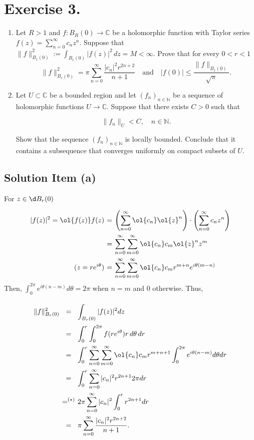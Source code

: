 
\section*{Exercise 3.}
\begin{enumerate}[label=(\alph*)]
    \item Let \( R > 1 \) and \( f : B_R(0) \to \mathbb{C} \) be a holomorphic function with Taylor series \( f(z) = \sum_{n=0}^{\infty} c_n z^n \). Suppose that \( \| f \|_{B_1(0)}^2 := \int_{B_1(0)} |f(z)|^2 \, dz = M < \infty \).
    Prove that for every \( 0 < r < 1 \)
    \[
    \| f \|_{B_r(0)}^2 = \pi \sum_{n=0}^{\infty} \frac{|c_n|^2 r^{2n+2}}{n + 1}
    \quad \text{and} \quad
    |f(0)| \leq \frac{\| f \|_{B_1(0)}}{\sqrt{\pi}}.
    \]
    \item Let \( U \subset \mathbb{C} \) be a bounded region and let \( (f_n)_{n \in \mathbb{N}} \) be a sequence of holomorphic functions \( U \to \mathbb{C} \). Suppose that there exists \( C > 0 \) such that

    \[
    \| f_n \|_U < C, \quad n \in \mathbb{N}.
    \]
    
    Show that the sequence \( (f_n)_{n \in \mathbb{N}} \) is locally bounded. Conclude that it contains a subsequence that converges uniformly on compact subsets of \( U \).
\end{enumerate}


\subsection*{Solution Item (a)}

For $z \in \d B_r(0)$
\[ \everymath{\displaystyle}
\arraycolsep=1.8pt\def\arraystretch{2.5}
\begin{array}{rcl}
    |f(z)|^2 = \ol{f(z)}f(z) & = & \left( \sum_{n=0}^{\infty} \ol{c_n} \ol{z}^n \right) \cdot \left( \sum_{n=0}^{\infty} c_n z^n \right)\\
    & = & \sum_{n = 0}^{\infty} \sum_{m = 0}^\infty \ol{c_n}c_{m} \ol{z}^n z^{m}\\
   (z = r e^{i\theta}) & = & \sum_{n = 0}^{\infty} \sum_{m = 0}^\infty \ol{c_n}c_{m} r^{m+n} e^{i\theta(m-n)}
\end{array} \]
Then, $\int_{0}^{2\pi} e^{i\theta (n-m)} d\theta = 2\pi$ when $n = m$ and $0$ otherwise. Thus,
\[ \everymath{\displaystyle}
\arraycolsep=1.8pt\def\arraystretch{2.5}
\begin{array}{rcl}
    \|f\|^2_{B_r(0)} & = & \int_{B_r(0)}|f(z)|^2 dz\\
    & = & \int_0^r \int_0^{2\pi} f(re^{i\theta}) r \, d\theta\, d r\\
    & = & \int_0^r \sum_{n = 0}^{\infty} \sum_{m = 0}^\infty \ol{c_n}c_{m} r^{m+n+1} \int_{0}^{2\pi} e^{i\theta (n-m)} d\theta dr\\
    & = & \int_0^r \sum_{n = 0}^{\infty} |c_n|^2 r^{2n+1} 2\pi dr\\
    & =^{(\star)} & 2\pi \sum_{n = 0}^{\infty} |c_n|^2  \int_0^r r^{2n+1} dr\\
    & = & \pi \sum_{n = 0}^{\infty} \frac{|c_n|^2 r^{2n+2}}{n+1}.
\end{array} \]

